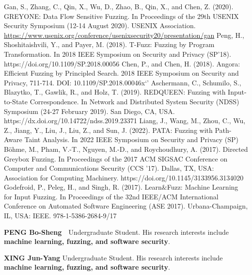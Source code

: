 \documentclass[10.5pt,compsoc]{CjC}
\theoremstyle{mystyle}
\begin{document}
\begin{thebibliography}{99}
  Gan, S., Zhang, C., Qin, X., Wu, D., Zhao, B., Qin, X., and Chen, Z. (2020). GREYONE: Data Flow Sensitive Fuzzing. In Proceedings of the 29th USENIX Security Symposium (12-14 August 2020). USENIX Association. 
  \url{https://www.usenix.org/conference/usenixsecurity20/presentation/gan}
  Peng, H., Shoshitaishvili, Y., and Payer, M. (2018). T-Fuzz: Fuzzing by Program Transformation. In 2018 IEEE Symposium on Security and Privacy (SP'18). https://doi.org/10.1109/SP.2018.00056
  Chen, P., and Chen, H. (2018). Angora: Efficient Fuzzing by Principled Search. 2018 IEEE Symposium on Security and Privacy, 711-714. DOI: 10.1109/SP.2018.00046x`'
  Aschermann, C., Schumilo, S., Blazytko, T., Gawlik, R., and Holz, T. (2019). REDQUEEN: Fuzzing with Input-to-State Correspondence. In Network and Distributed System Security (NDSS) Symposium (24-27 February 2019). San Diego, CA, USA. https://dx.doi.org/10.14722/ndss.2019.23371
  Liang, J., Wang, M., Zhou, C., Wu, Z., Jiang, Y., Liu, J., Liu, Z., and Sun, J. (2022). PATA: Fuzzing with Path-Aware Taint Analysis. In 2022 IEEE Symposium on Security and Privacy (SP)
  Böhme, M., Pham, V.-T., Nguyen, M.-D., and Roychoudhury, A. (2017). Directed Greybox Fuzzing. In Proceedings of the 2017 ACM SIGSAC Conference on Computer and Communications Security (CCS ’17). Dallas, TX, USA: Association for Computing Machinery. https://doi.org/10.1145/3133956.3134020
  Godefroid, P., Peleg, H., and Singh, R. (2017). Learn$\&$Fuzz: Machine Learning for Input Fuzzing. In Proceedings of the 32nd IEEE/ACM International Conference on Automated Software Engineering (ASE 2017). Urbana-Champaign, IL, USA: IEEE. 978-1-5386-2684-9/17
\end{thebibliography}

\vspace{10mm}

\begin{biography}
\noindent
\textbf{PENG Bo-Sheng}\ \ Undergraduate Student. His research interests include \textbf{machine learning, fuzzing, and software security}.
\end{biography}

\vspace{10mm}
\begin{biography}
\noindent
\textbf{XING Jun-Yang} Undergraduate Student. His research interests include \textbf{machine learning, fuzzing, and software security}.
\end{biography}
\vspace{10mm}
\end{document}
